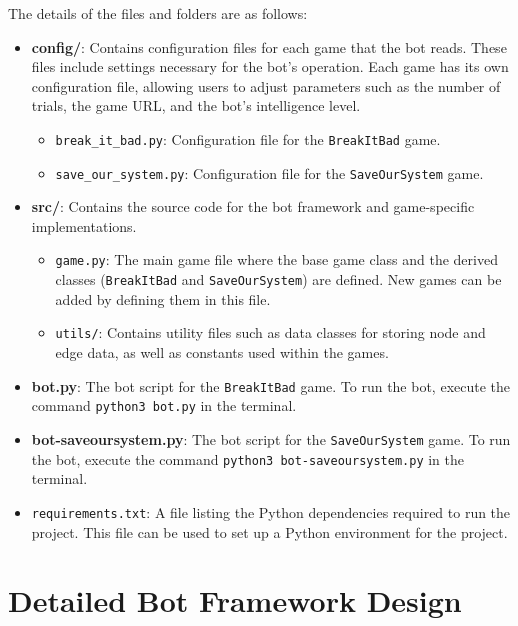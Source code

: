\documentclass[12pt,a4paper]{report}
\begin{document}
    \vspace{1cm}
    The details of the files and folders are as follows:

    \begin{itemize}
        \item \textbf{config/}: Contains configuration files for each game that the bot reads. These files include settings necessary for the bot’s operation. Each game has its own configuration file, allowing users to adjust parameters such as the number of trials, the game URL, and the bot’s intelligence level.
        \begin{itemize}
            \item \texttt{break\_it\_bad.py}: Configuration file for the \texttt{BreakItBad} game.
            \item \texttt{save\_our\_system.py}: Configuration file for the \texttt{SaveOurSystem} game.
        \end{itemize}
        \item \textbf{src/}: Contains the source code for the bot framework and game-specific implementations.
        \begin{itemize}
            \item \texttt{game.py}: The main game file where the base game class and the derived classes (\texttt{BreakItBad} and \texttt{SaveOurSystem}) are defined. New games can be added by defining them in this file.
            \item \texttt{utils/}: Contains utility files such as data classes for storing node and edge data, as well as constants used within the games.
        \end{itemize}
        \item \textbf{bot.py}: The bot script for the \texttt{BreakItBad} game. To run the bot, execute the command \texttt{python3 bot.py} in the terminal.
        \item \textbf{bot-saveoursystem.py}: The bot script for the \texttt{SaveOurSystem} game. To run the bot, execute the command \texttt{python3 bot-saveoursystem.py} in the terminal.
        \item \texttt{requirements.txt}: A file listing the Python dependencies required to run the project. This file can be used to set up a Python environment for the project.
    \end{itemize}

    \chapter{Detailed Bot Framework Design}
    \label{sec:appendix-bot-framework}
\end{document}
